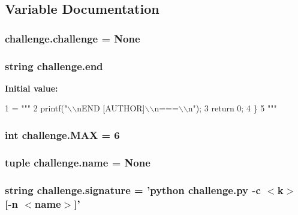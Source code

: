 \subsection{Variable Documentation}
\hypertarget{namespacechallenge_acbb95559d4ccdc708dbe25b0e3f4fdc1}{
\subsubsection[{challenge}]{\setlength{\rightskip}{0pt plus 5cm}challenge.\+challenge = None}}\label{namespacechallenge_acbb95559d4ccdc708dbe25b0e3f4fdc1}
\hypertarget{namespacechallenge_afb0fb528223ea61f11c1b58c6347615b}{
\subsubsection[{end}]{\setlength{\rightskip}{0pt plus 5cm}string challenge.\+end}}\label{namespacechallenge_afb0fb528223ea61f11c1b58c6347615b}
{\bfseries Initial value\+:}
\begin{DoxyCode}
1 = \textcolor{stringliteral}{"""}
2 \textcolor{stringliteral}{    printf("\(\backslash\)\(\backslash\)nEND [AUTHOR]\(\backslash\)\(\backslash\)n===\(\backslash\)\(\backslash\)n");}
3 \textcolor{stringliteral}{    return 0;}
4 \textcolor{stringliteral}{\}}
5 \textcolor{stringliteral}{"""}
\end{DoxyCode}
\hypertarget{namespacechallenge_ad8c86193dd63741365d24f15c86016cd}{
\subsubsection[{M\+A\+X}]{\setlength{\rightskip}{0pt plus 5cm}int challenge.\+M\+A\+X = 6}}\label{namespacechallenge_ad8c86193dd63741365d24f15c86016cd}
\hypertarget{namespacechallenge_a87918958a52107704ecf6f8bbfda0bc0}{
\subsubsection[{name}]{\setlength{\rightskip}{0pt plus 5cm}tuple challenge.\+name = None}}\label{namespacechallenge_a87918958a52107704ecf6f8bbfda0bc0}
\hypertarget{namespacechallenge_a106c0b09acb89c2a5708100c0413cf3f}{
\subsubsection[{signature}]{\setlength{\rightskip}{0pt plus 5cm}string challenge.\+signature = 'python challenge.\+py -\/c $<$k$>$ \mbox{[}-\/n $<${\bf name}$>$\mbox{]}'}}\label{namespacechallenge_a106c0b09acb89c2a5708100c0413cf3f}
